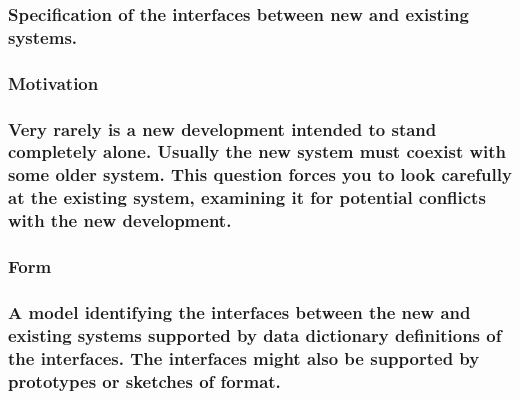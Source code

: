 \documentclass[
]{article}
\begin{document}
\hypertarget{specification-of-the-interfaces-between-new-and-existing-systems.}{%
\subsubsection{Specification of the interfaces between new and existing
systems.}\label{specification-of-the-interfaces-between-new-and-existing-systems.}}

\hypertarget{motivation-64}{%
\subsubsection{Motivation}\label{motivation-64}}

\hypertarget{very-rarely-is-a-new-development-intended-to-stand-completely-alone.-usually-the-new-system-must-coexist-with-some-older-system.-this-question-forces-you-to-look-carefully-at-the-existing-system-examining-it-for-potential-conflicts-with-the-new-development.}{%
\subsubsection{Very rarely is a new development intended to stand
completely alone. Usually the new system must coexist with some older
system. This question forces you to look carefully at the existing
system, examining it for potential conflicts with the new
development.}\label{very-rarely-is-a-new-development-intended-to-stand-completely-alone.-usually-the-new-system-must-coexist-with-some-older-system.-this-question-forces-you-to-look-carefully-at-the-existing-system-examining-it-for-potential-conflicts-with-the-new-development.}}

\hypertarget{form-32}{%
\subsubsection{Form}\label{form-32}}

\hypertarget{a-model-identifying-the-interfaces-between-the-new-and-existing-systems-supported-by-data-dictionary-definitions-of-the-interfaces.-the-interfaces-might-also-be-supported-by-prototypes-or-sketches-of-format.}{%
\subsubsection{A model identifying the interfaces between the new and
existing systems supported by data dictionary definitions of the
interfaces. The interfaces might also be supported by prototypes or
sketches of
format.}\label{a-model-identifying-the-interfaces-between-the-new-and-existing-systems-supported-by-data-dictionary-definitions-of-the-interfaces.-the-interfaces-might-also-be-supported-by-prototypes-or-sketches-of-format.}}
\end{document}
